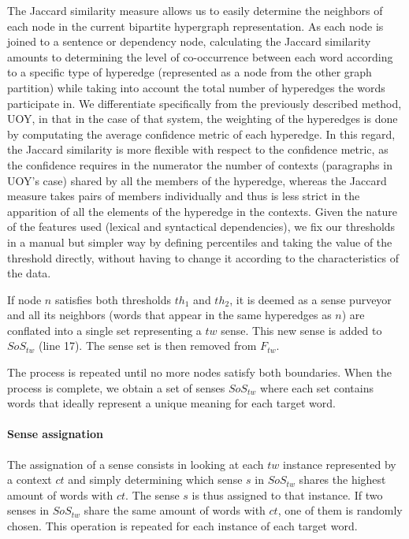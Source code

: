 The Jaccard similarity measure allows us to easily determine the neighbors of each node in the current bipartite hypergraph representation. As each node is joined to a sentence or dependency node, calculating the Jaccard similarity amounts to determining the level of co-occurrence between each word according to a specific type of hyperedge (represented as a node from the other graph partition) while taking into account the total number of hyperedges the words participate in. We differentiate specifically from the previously described method, UOY, in that in the case of that system, the weighting of the hyperedges is done by computating the average confidence metric of each hyperedge. In this regard, the Jaccard similarity is more flexible with respect to the confidence metric, as the confidence requires in the numerator the number of contexts (paragraphs in UOY's case) shared by all the members of the hyperedge, whereas the Jaccard measure takes pairs of members individually and thus is less strict in the apparition of all the elements of the hyperedge in the contexts. Given the nature of the features used (lexical and syntactical dependencies), we fix our thresholds in a manual but simpler way by defining percentiles and taking the value of the threshold directly, without having to change it according to the characteristics of the data.

If node $n$ satisfies both thresholds $th_1$ and $th_2$, it is deemed as a sense purveyor and all its neighbors (words that appear in the same hyperedges as $n$) are conflated into a single set representing a $tw$ sense. This new sense is added to $SoS_{tw}$ (line 17). The sense set is then removed from $F_{tw}$.

The process is repeated until no more nodes satisfy both boundaries. When the process is complete, we obtain a set of senses $SoS_{tw}$ where each set contains words that ideally represent a unique meaning for each target word. 

\paragraph{Sense assignation}

The assignation of a sense consists in looking at each $tw$ instance represented by a context $ct$ and simply determining which sense $s$ in $SoS_{tw}$ shares the highest amount of words with $ct$. The sense $s$ is thus assigned to that instance. If two senses in $SoS_{tw}$ share the same amount of words with $ct$, one of them is randomly chosen.  This operation is repeated for each instance of each target word. 


